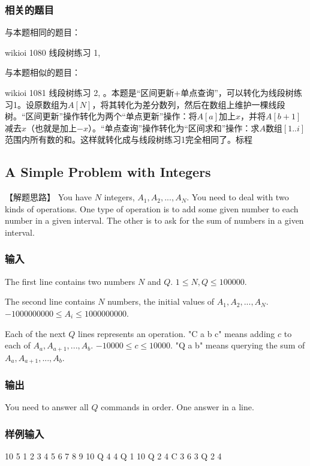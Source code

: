 \subsubsection{相关的题目}
与本题相同的题目：
\begindot
\item wikioi 1080 线段树练习 1, 
\myenddot

与本题相似的题目：
\begindot
\item  wikioi 1081 线段树练习 2,  。本题是“区间更新+单点查询”，可以转化为线段树练习1。设原数组为$A[N]$，将其转化为差分数列，然后在数组上维护一棵线段树。“区间更新”操作转化为两个“单点更新”操作：将$A[a]$加上$x$，并将$A[b+1]$减去$x$（也就是加上$-x$）。“单点查询”操作转化为“区间求和”操作：求$A$数组$[1..i]$范围内所有数的和。这样就转化成与线段树练习1完全相同了。标程 
\myenddot


\subsection{A Simple Problem with Integers} %
【解题思路】
You have $N$ integers, $A_1, A_2, ... , A_N$. You need to deal with two kinds of operations. One type of operation is to add some given number to each number in a given interval. The other is to ask for the sum of numbers in a given interval.

\subsubsection{输入}
The first line contains two numbers $N$ and $Q$. $1 \leq N,Q \leq 100000$.

The second line contains $N$ numbers, the initial values of $A_1, A_2, ... , A_N$. $-1000000000 \leq A_i \leq 1000000000$.

Each of the next $Q$ lines represents an operation.
"C a b c" means adding $c$ to each of $A_a, A_{a+1}, ... , A_b$. $-10000 ≤ c ≤ 10000$.
"Q a b" means querying the sum of $A_a, A_{a+1}, ... , A_b$.

\subsubsection{输出}
You need to answer all $Q$ commands in order. One answer in a line.

\subsubsection{样例输入}
\begin{Code}
10 5
1 2 3 4 5 6 7 8 9 10
Q 4 4
Q 1 10
Q 2 4
C 3 6 3
Q 2 4
\end{Code}

